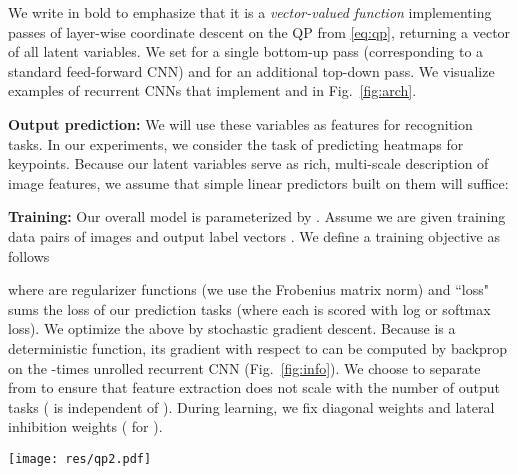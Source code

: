 \documentclass[10pt,twocolumn,letterpaper]{article}
\newcommand{\QP}[1]{{}}
\begin{document}
We write  in bold to emphasize that it is a {\em
  vector-valued function} implementing  passes of layer-wise
coordinate descent on the QP from \eqref{eq:qp}, returning a vector of
all  latent variables. We set  for a single bottom-up pass
(corresponding to a standard feed-forward CNN) and  for an
additional top-down pass. We visualize examples of recurrent CNNs that
implement \QP{1} and \QP{2} in Fig.~\ref{fig:arch}.

{\bf Output prediction:} We will use these  variables as features
for  recognition tasks. In our experiments, we consider the task of
predicting heatmaps for  keypoints. Because our latent variables
serve as rich, multi-scale description of image features, we assume
that simple linear predictors built on them will suffice:


{\bf Training:} Our overall model is parameterized by
. Assume we are given training data pairs of images and
output label vectors . We define a training objective as
follows

\noindent where  are regularizer functions (we use the Frobenius
matrix norm) and ``loss" sums the loss of our  prediction tasks
(where each is scored with log or softmax loss). We optimize the above
by stochastic gradient descent. Because  is a
deterministic function, its
gradient with respect to  can be computed by backprop on the -times
unrolled recurrent CNN (Fig.~\ref{fig:info}). We choose to separate
 from  to ensure that feature extraction does not scale with the
number of output tasks ( is independent of ).  During
learning, we fix diagonal weights  and lateral
inhibition weights ( for
).

\begin{figure*}[t]
\centering
  \texttt{[image: res/qp2.pdf]}\\
\caption{We show the architecture of \QP{2} implemented in our
    experiments. \QP{1} corresponds to the left half of \QP{2}, which
    essentially resembles the state-of-the-art VGG-16 CNN
    \cite{simonyan2014very}. \QP{2} is implemented with an 2X
    ``unrolled'' recurrent CNN with transposed weights, skip
    connections, and zero-interlaced upsampling (as shown in
    Fig.~\ref{fig:cnn}). Importantly, \QP{2} does not require any
    additional parameters. Red layers include lateral inhibitory
    connections enforced with NMS. Purple layers denote multi-scale
    convolutional filters that (linearly) predict keypoint heatmaps
    given activations from different layers. Multi-scale filters are
    efficiently implemented with coarse-to-fine
    upsampling~\cite{long2014fully}, visualized in the purple dotted
    rectangle (to reduce clutter, we visualize only 3 of the 4 multiscale layers). Dotted layers are not implemented to reduce memory.}
  \label{fig:arch}
\end{figure*}
\end{document}
